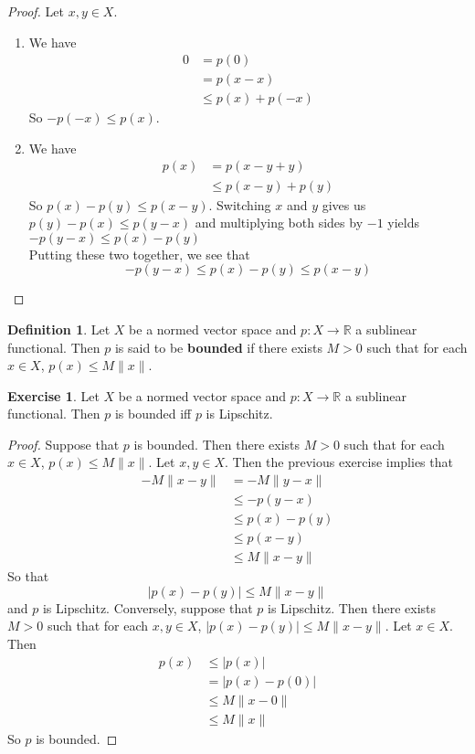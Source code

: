 \documentclass[12pt]{amsart}
\theoremstyle{definition}
\newtheorem{defn}[definition]{Definition}
\newtheorem{ex}[definition]{Exercise}
\newcommand{\R}{\mathbb{R}}
\newcommand{\lex}[1]{\label{ex:#1}}
\newcommand{\ld}[1]{\label{defn:#1}}
\begin{document}
	\begin{proof}
	Let $x, y \in X$.
	\begin{enumerate}
	\item We have
	\begin{align*}
	0
	&= p(0) \\ 
	&= p(x - x) \\
	& \leq p(x) + p(-x)
	\end{align*}
	So $-p(-x) \leq p(x)$.
	\item We have
	\begin{align*}
	p(x)
	&= p(x -y + y) \\
	& \leq p(x-y) + p(y)
	\end{align*}
	So $p(x) - p(y) \leq p(x-y)$. Switching $x$ and $y$ gives us $p(y) - p(x) \leq p(y-x)$ and multiplying both sides by $-1$ yields $-p(y-x) \leq p(x) - p(y)$ \\ 
	Putting these two together, we see that $$-p(y-x) \leq p(x) - p(y) \leq p(x-y)$$
	\end{enumerate}
	\end{proof}
	
	\begin{defn} \ld{}
	Let $X$ be a normed vector space and $p:X \rightarrow \R$ a sublinear functional. Then $p$ is said to be \textbf{bounded} if there exists $M >0$ such that for each $x \in X$, $p(x) \leq M\|x\|$. 
	\end{defn}
	
	\begin{ex} \lex{}
	Let $X$ be a normed vector space and $p:X \rightarrow \R$ a sublinear functional. Then $p$ is bounded iff $p$ is Lipschitz. 
	\end{ex}
	
	\begin{proof}
	Suppose that $p$ is bounded. Then there exists $M >0$ such that for each $x \in X$, $p(x) \leq M\|x\|$. Let $x, y \in X$. Then the previous exercise implies that 
	\begin{align*}
	-M\|x-y\| 
	&= -M\|y-x\| \\
	& \leq -p(y-x) \\
	& \leq p(x)-p(y) \\
	& \leq p(x-y) \\
	& \leq M \| x-y\| 
	\end{align*}
	So that $$|p(x) - p(y)| \leq  M\|x-y\|$$
	and $p$ is Lipschitz.
	Conversely, suppose that $p$ is Lipschitz. Then there exists $M >0 $ such that for each $x ,y \in X$, $|p(x) - p(y)| \leq  M\|x-y\|$. Let $x \in X$. Then 
	\begin{align*}
	p(x) 
	& \leq |p(x)| \\
	& = |p(x) - p(0)| \\
	& \leq M\|x - 0\| \\
	  & \leq M\|x\| 
	\end{align*}
	So $p$ is bounded.
	\end{proof}
	
\end{document}
